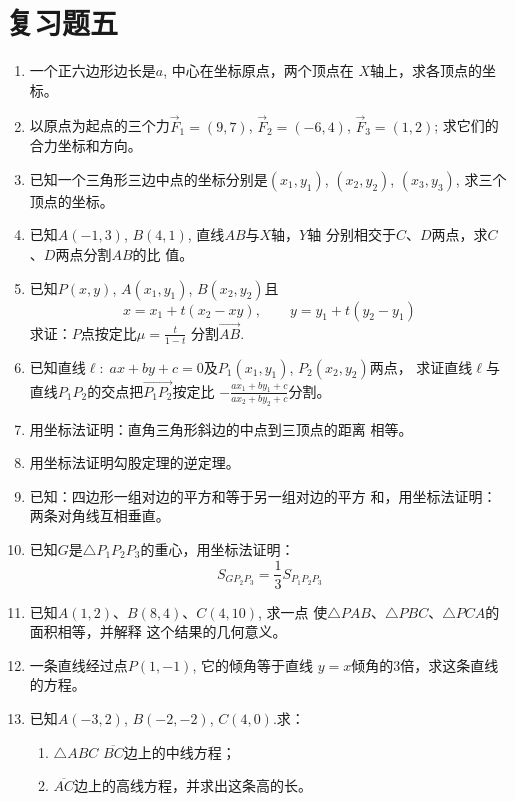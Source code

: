 \section*{复习题五}
\begin{enumerate}
    \item 一个正六边形边长是$a$, 中心在坐标原点，两个顶点在
    $X$轴上，求各顶点的坐标。
    \item 以原点为起点的三个力$\vec{F}_1=(9,7)$, $\vec{F}_2=(-6,4)$, 
    $\vec{F}_3=(1,2)$; 求它们的合力坐标和方向。
    \item 已知一个三角形三边中点的坐标分别是$(x_1,y_1)$, $(x_2,
    y_2)$, $(x_3,y_3)$, 求三个顶点的坐标。
    \item 已知$A(-1,3)$, $B(4,1)$, 直线$AB$与$X$轴，$Y$轴
    分别相交于$C$、$D$两点，求$C$、$D$两点分割$AB$的比
    值。
    \item 已知$P(x,y)$, $A(x_1,y_1)$, $B(x_2,y_2)$且
    \[x=x_1+t(x_2-xy),\qquad y=y_1+t(y_2-y_1)\]
    求证：$P$点按定比$\mu=\frac{t}{1-t}$
    分割$\Vec{AB}$.
    \item 已知直线$\ell:\; ax+by+c=0$及$P_1(x_1,y_1)$, $P_2(x_2,  y_2)$两点，
    求证直线$\ell$与直线$P_1P_2$的交点把$\Vec{P_1P_2}$按定比
$-\frac{ax_1+by_1+c}{ax_2+by_2+c}$分割。
\item 用坐标法证明：直角三角形斜边的中点到三顶点的距离
相等。
\item 用坐标法证明勾股定理的逆定理。
\item 已知：四边形一组对边的平方和等于另一组对边的平方
和，用坐标法证明：两条对角线互相垂直。
\item 已知$G$是$\triangle P_1P_2P_3$的重心，用坐标法证明：
\[S_{GP_2P_3}=\frac{1}{3}S_{P_1P_2P_3}\]
\item 已知$A(1,2)$、$B(8,4)$、$C(4,10)$, 求一点
使$\triangle PAB$、$\triangle PBC$、$\triangle PCA$的面积相等，并解释
这个结果的几何意义。
\item 一条直线经过点$P(1,-1)$, 它的倾角等于直线
$y=x$倾角的3倍，求这条直线的方程。
\item 已知$A(-3,2)$, $B(-2,-2)$, $C(4,0)$.求：
\begin{enumerate}
    \item $\triangle ABC$ $\overline{BC}$边上的中线方程；
    \item $\overline{AC}$边上的高线方程，并求出这条高的长。
\end{enumerate}


\end{enumerate}
